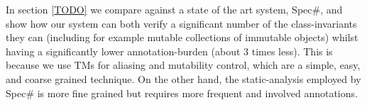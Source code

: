 In section \ref{TODO} we compare against a state of the art system, Spec\#, and show how our system can both verify a significant number of the class-invariants they can (including for example mutable collections of immutable objects) whilst having a significantly lower annotation-burden (about 3 times less).
This is because we use TMs for aliasing and mutability control, which are a simple, easy, and coarse grained
technique. On the other hand, the static-analysis employed by Spec\# is more fine grained but requires more frequent and involved annotations.










